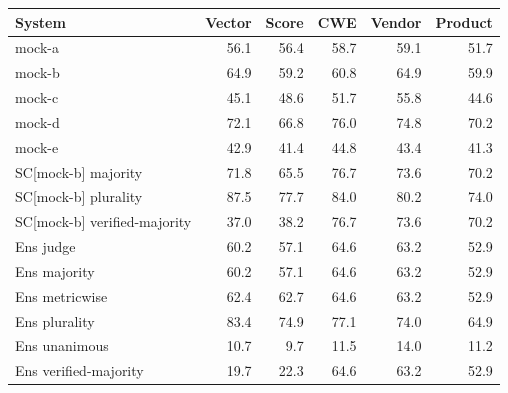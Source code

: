 \begin{tabular}{lrrrrr}
\toprule
System & Vector & Score & CWE & Vendor & Product \\
\midrule
mock-a & 56.1 & 56.4 & 58.7 & 59.1 & 51.7 \\
mock-b & 64.9 & 59.2 & 60.8 & 64.9 & 59.9 \\
mock-c & 45.1 & 48.6 & 51.7 & 55.8 & 44.6 \\
mock-d & 72.1 & 66.8 & 76.0 & 74.8 & 70.2 \\
mock-e & 42.9 & 41.4 & 44.8 & 43.4 & 41.3 \\
\midrule
SC[mock-b] majority & 71.8 & 65.5 & 76.7 & 73.6 & 70.2 \\
SC[mock-b] plurality & 87.5 & 77.7 & 84.0 & 80.2 & 74.0 \\
SC[mock-b] verified-majority & 37.0 & 38.2 & 76.7 & 73.6 & 70.2 \\
\midrule
Ens judge & 60.2 & 57.1 & 64.6 & 63.2 & 52.9 \\
Ens majority & 60.2 & 57.1 & 64.6 & 63.2 & 52.9 \\
Ens metricwise & 62.4 & 62.7 & 64.6 & 63.2 & 52.9 \\
Ens plurality & 83.4 & 74.9 & 77.1 & 74.0 & 64.9 \\
Ens unanimous & 10.7 & 9.7 & 11.5 & 14.0 & 11.2 \\
Ens verified-majority & 19.7 & 22.3 & 64.6 & 63.2 & 52.9 \\
\bottomrule
\end{tabular}
